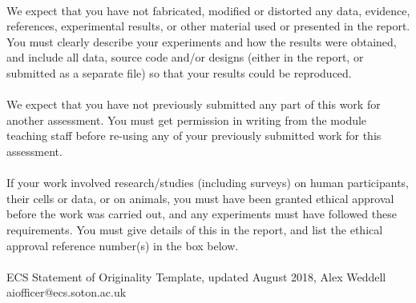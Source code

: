 \documentclass{article}
\begin{document}
\\[0.5cm]

We expect that you have not fabricated, modified or distorted any data, evidence, references,
experimental results, or other material used or presented in the report. You must clearly describe
your experiments and how the results were obtained, and include all data, source code and/or
designs (either in the report, or submitted as a separate file) so that your results could be
reproduced.\\

\\[0.5cm]

We expect that you have not previously submitted any part of this work for another assessment.
You must get permission in writing from the module teaching staff before re-using any of your
previously submitted work for this assessment.\\

\\[0.5cm]

If your work involved research/studies (including surveys) on human participants, their cells or
data, or on animals, you must have been granted ethical approval before the work was carried
out, and any experiments must have followed these requirements. You must give details of this in
the report, and list the ethical approval reference number(s) in the box below.\\

\\[0.5cm]


ECS Statement of Originality Template, updated August 2018, Alex Weddell aiofficer@ecs.soton.ac.uk\\


\newpage 

\tableofcontents 



\newpage 
\end{document}
